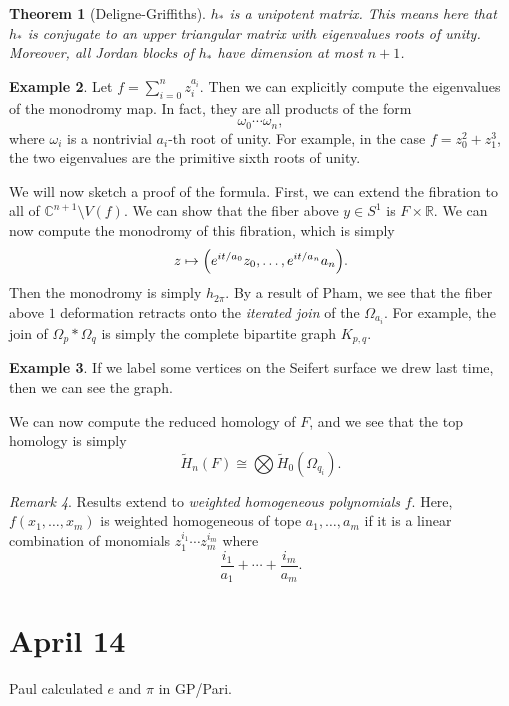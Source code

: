 \documentclass[leqno, openany]{memoir}
\newtheorem{thm}{Theorem}[chapter]
\theoremstyle{definition}
\newtheorem{exm}[thm]{Example}
\theoremstyle{remark}
\newtheorem{rmk}[thm]{Remark}
\theoremstyle{plain}
\theoremstyle{definition}
\theoremstyle{remark}
\newcommand{\R}{\mathbb{R}}
\newcommand{\C}{\mathbb{C}}
\begin{document}
\begin{thm}[Deligne-Griffiths]
    $h_*$ is a unipotent matrix. This means here that $h_*$ is conjugate to an upper triangular matrix with eigenvalues roots of unity. Moreover, all Jordan blocks of $h_*$ have dimension at most $n+1$.
\end{thm}

\begin{exm}
    Let $f = \sum_{i=0}^n z_i^{a_i}$. Then we can explicitly compute the eigenvalues of the monodromy map. In fact, they are all products of the form
    \[ \omega_0 \cdots \omega_n, \]
    where $\omega_i$ is a nontrivial $a_i$-th root of unity. For example, in the case $f = z_0^2 + z_1^3$, the two eigenvalues are the primitive sixth roots of unity.
\end{exm}

We will now sketch a proof of the formula. First, we can extend the fibration to all of $\C^{n+1} \setminus V(f)$. We can show that the fiber above $y \in S^1$ is $F \times \R$. We can now compute the monodromy of this fibration, which is simply
\[ z \mapsto \qty(e^{it/a_0} z_0, \ldots, e^{it/a_n} a_n). \]
Then the monodromy is simply $h_{2\pi}$. By a result of Pham, we see that
the fiber above $1$ deformation retracts onto the \textit{iterated join} of the $\Omega_{a_i}$. For example, the join of $\Omega_p * \Omega_q$ is simply the complete bipartite graph $K_{p,q}$.

\begin{exm}
    If we label some vertices on the Seifert surface we drew last time, then we can see the graph.
\end{exm}

We can now compute the reduced homology of $F$, and we see that the top homology is simply 
\[ \widetilde{H}_n(F) \cong \bigotimes \widetilde{H}_0(\Omega_{q_i}). \] 

\begin{rmk}
    Results extend to \textit{weighted homogeneous polynomials} $f$. Here, $f(x_1, \ldots, x_m)$ is weighted homogeneous of tope $a_1, \ldots, a_m$ if it is a linear combination of monomials $z_1^{i_1} \cdots z_m^{i_m}$ where
    \[ \frac{i_1}{a_1} + \cdots + \frac{i_m}{a_m}. \]  
\end{rmk}

\chapter{April 14}%
\label{cha:april_14}

Paul calculated $e$ and $\pi$ in GP/Pari.
\end{document}

